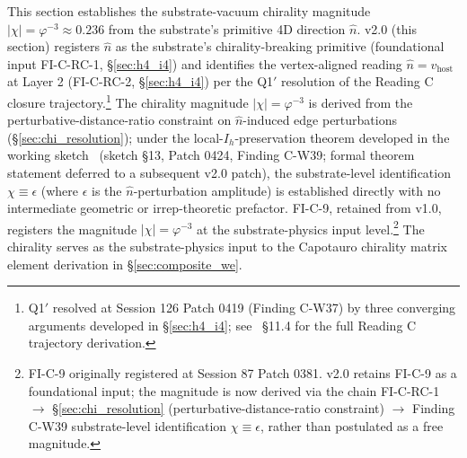 \documentclass[11pt,letterpaper]{article}
\newcommand{\phig}{\varphi}
\begin{document}
This section establishes the substrate-vacuum chirality magnitude $|\chi| = \phig^{-3} \approx 0.236$ from the substrate's primitive 4D direction $\hat{n}$. v2.0 (this section) registers $\hat{n}$ as the substrate's chirality-breaking primitive (foundational input FI-C-RC-1, \S\ref{sec:h4_i4}) and identifies the vertex-aligned reading $\hat{n} = v_{\text{host}}$ at Layer 2 (FI-C-RC-2, \S\ref{sec:h4_i4}) per the Q1$'$ resolution of the Reading C closure trajectory.\footnote{Q1$'$ resolved at Session 126 Patch 0419 (Finding C-W37) by three converging arguments developed in \S\ref{sec:h4_i4}; see~\cite{abshier_capotauro_chiral_mechanism_sketch} \S11.4 for the full Reading C trajectory derivation.} The chirality magnitude $|\chi| = \phig^{-3}$ is derived from the perturbative-distance-ratio constraint on $\hat{n}$-induced edge perturbations (\S\ref{sec:chi_resolution}); under the local-$I_h$-preservation theorem developed in the working sketch~\cite{abshier_capotauro_chiral_mechanism_sketch} (sketch \S13, Patch 0424, Finding C-W39; formal theorem statement deferred to a subsequent v2.0 patch), the substrate-level identification $\chi \equiv \epsilon$ (where $\epsilon$ is the $\hat{n}$-perturbation amplitude) is established directly with no intermediate geometric or irrep-theoretic prefactor. FI-C-9, retained from v1.0, registers the magnitude $|\chi| = \phig^{-3}$ at the substrate-physics input level.\footnote{FI-C-9 originally registered at Session 87 Patch 0381. v2.0 retains FI-C-9 as a foundational input; the magnitude is now derived via the chain FI-C-RC-1 $\to$ \S\ref{sec:chi_resolution} (perturbative-distance-ratio constraint) $\to$ Finding C-W39 substrate-level identification $\chi \equiv \epsilon$, rather than postulated as a free magnitude.} The chirality serves as the substrate-physics input to the Capotauro chirality matrix element derivation in \S\ref{sec:composite_we}.
\end{document}
